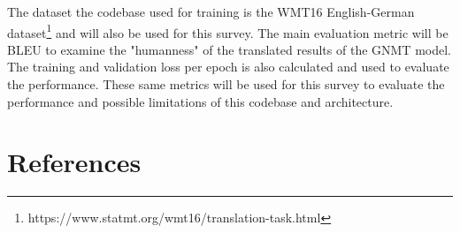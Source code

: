 \documentclass{article}
\begin{document}
The dataset the codebase used for training is the WMT16 English-German dataset\footnote{https://www.statmt.org/wmt16/translation-task.html} and will also be used for this survey. The main evaluation metric will be BLEU to examine the "humanness" of the translated results of the GNMT model. The training and validation loss per epoch is also calculated and used to evaluate the performance. These same metrics will be used for this survey to evaluate the performance and possible limitations of this codebase and architecture.

\section{References}
% 


\end{document}
